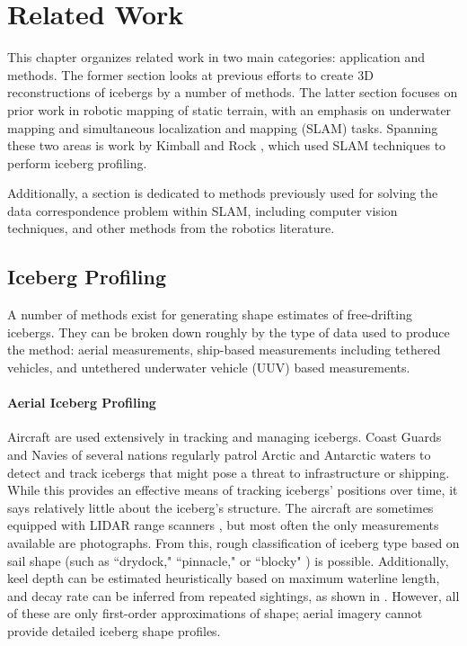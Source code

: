 
\chapter{Related Work}
\label{ch.RelatedWork}

This chapter organizes related work in two main categories: application and methods. The former section looks at previous efforts to create 3D reconstructions of icebergs by a number of methods. The latter section focuses on prior work in robotic mapping of static terrain, with an emphasis on underwater mapping and simultaneous localization and mapping (SLAM) tasks. Spanning these two areas is work by Kimball and Rock \cite{Kimball2011b}, which used SLAM techniques to perform iceberg profiling.

Additionally, a section is dedicated to methods previously used for solving the data correspondence problem within SLAM, including computer vision techniques, and other methods from the robotics literature.

\section{Iceberg Profiling}

A number of methods exist for generating shape estimates of free-drifting icebergs. They can be broken down roughly by the type of data used to produce the method: aerial measurements, ship-based measurements including tethered vehicles, and untethered underwater vehicle (UUV) based measurements.

\subsubsection{Aerial Iceberg Profiling}

Aircraft are used extensively in tracking and managing icebergs. Coast Guards and Navies of several nations regularly patrol Arctic and Antarctic waters to detect and track icebergs that might pose a threat to infrastructure or shipping. While this provides an effective means of tracking icebergs' positions over time, it says relatively little about the iceberg's structure. The aircraft are sometimes equipped with LIDAR range scanners \cite{Bunkin2012}, but most often the only measurements available are photographs. From this, rough classification of iceberg type based on sail shape (such as ``drydock," ``pinnacle," or ``blocky" ) is possible. Additionally, keel depth can be estimated heuristically based on maximum waterline length, and decay rate can be inferred from repeated sightings, as shown in \cite{Barker2004}. However, all of these are only first-order approximations of shape; aerial imagery cannot provide detailed iceberg shape profiles. 

